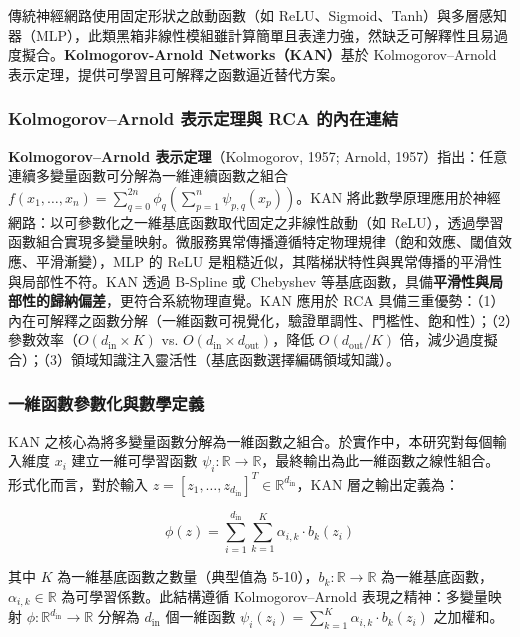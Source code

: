 \documentclass[10pt,a4paper,twocolumn]{article}
\begin{document}
傳統神經網路使用固定形狀之啟動函數（如 ReLU、Sigmoid、Tanh）與多層感知器（MLP），此類黑箱非線性模組雖計算簡單且表達力強，然缺乏可解釋性且易過度擬合。\textbf{Kolmogorov-Arnold Networks（KAN）}基於 Kolmogorov–Arnold 表示定理，提供可學習且可解釋之函數逼近替代方案。

\subsubsection{Kolmogorov–Arnold 表示定理與 RCA 的內在連結}

\textbf{Kolmogorov–Arnold 表示定理}（Kolmogorov, 1957; Arnold, 1957）指出：任意連續多變量函數可分解為一維連續函數之組合 $f(x_1, \ldots, x_n) = \sum_{q=0}^{2n} \phi_q\left( \sum_{p=1}^{n} \psi_{p,q}(x_p) \right)$。KAN 將此數學原理應用於神經網路：以可參數化之一維基底函數取代固定之非線性啟動（如 ReLU），透過學習函數組合實現多變量映射。微服務異常傳播遵循特定物理規律（飽和效應、閾值效應、平滑漸變），MLP 的 ReLU 是粗糙近似，其階梯狀特性與異常傳播的平滑性與局部性不符。KAN 透過 B-Spline 或 Chebyshev 等基底函數，具備\textbf{平滑性與局部性的歸納偏差}，更符合系統物理直覺。KAN 應用於 RCA 具備三重優勢：（1）內在可解釋之函數分解（一維函數可視覺化，驗證單調性、門檻性、飽和性）；（2）參數效率（$O(d_{\text{in}} \times K)$ vs. $O(d_{\text{in}} \times d_{\text{out}})$，降低 $O(d_{\text{out}}/K)$ 倍，減少過度擬合）；（3）領域知識注入靈活性（基底函數選擇編碼領域知識）。

\subsubsection{一維函數參數化與數學定義}

KAN 之核心為將多變量函數分解為一維函數之組合。於實作中，本研究對每個輸入維度 $x_i$ 建立一維可學習函數 $\psi_i: \mathbb{R} \to \mathbb{R}$，最終輸出為此一維函數之線性組合。形式化而言，對於輸入 $z = [z_1, \ldots, z_{d_{\text{in}}}]^T \in \mathbb{R}^{d_{\text{in}}}$，KAN 層之輸出定義為：

\begin{equation}
\phi(z) = \sum_{i=1}^{d_{\text{in}}} \sum_{k=1}^{K} \alpha_{i,k} \cdot b_k(z_i)
\end{equation}

其中 $K$ 為一維基底函數之數量（典型值為 5-10），$b_k: \mathbb{R} \to \mathbb{R}$ 為一維基底函數，$\alpha_{i,k} \in \mathbb{R}$ 為可學習係數。此結構遵循 Kolmogorov–Arnold 表現之精神：多變量映射 $\phi: \mathbb{R}^{d_{\text{in}}} \to \mathbb{R}$ 分解為 $d_{\text{in}}$ 個一維函數 $\psi_i(z_i) = \sum_{k=1}^{K} \alpha_{i,k} \cdot b_k(z_i)$ 之加權和。
\end{document}
